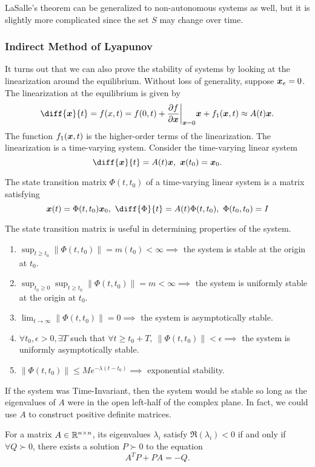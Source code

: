 LaSalle's theorem can be generalized to non-autonomous systems as well, but it
is slightly more complicated since the set $S$ may change over time.

\subsubsection{Indirect Method of Lyapunov}
It turns out that we can also prove the stability of systems by looking at the
linearization around the equilibrium. Without loss of generality, suppose
$\boldsymbol{x}_e = 0$. The linearization at the equilibrium is given by \[
	\diff{\bs{x}}{t} = f(x,t) = f(0, t) + \frac{\partial f}{\partial
	\bs{x}}\bigg\lvert_{\bs{x} = 0}\bs{x} + f_1(\bs{x},t) \approx A(t)\bs{x}.
\]
The function $f_1(\boldsymbol{x}, t)$ is the higher-order terms of the linearization.
The linearization is a time-varying system.
Consider the time-varying linear system
\[
	\diff{\bs{x}}{t} = A(t)\bs{x},\ \bs{x}(t_0) = \bs{x}_0.
\]
\begin{definition}
	The state transition matrix $\Phi(t, t_0)$ of a time-varying linear system is
	a matrix satisfying \[
		\bs{x}(t) = \Phi(t, t_0)\bs{x}_0,\ \diff{\Phi}{t} = A(t)\Phi(t, t_0),\
		\Phi(t_0, t_0) = I
	\]
	\label{defn:state-transition-matrix}
\end{definition}
The state transition matrix is useful in determining properties of the system.
\begin{enumerate}
	\item $\sup_{t\geq t_0} \|\Phi(t, t_0)\| = m(t_0) < \infty \implies$ the system
		is stable at the origin at $t_0$.
	\item $\sup_{t_0\geq 0}\sup_{t\geq t_0} \|\Phi(t, t_0)\| = m < \infty \implies$ the system
		is uniformly stable at the origin at $t_0$.
	\item $\lim_{t\to\infty}\|\Phi(t, t_0)\| = 0 \implies$ the system is
		asymptotically stable.
	\item $\forall t_0,\epsilon>0,\exists T$ such that $\forall t\geq t_0 + T,\ \|\Phi(t, t_0)\| <
		\epsilon \implies$ the system is uniformly asymptotically stable.
	\item $\|\Phi(t, t_0)\| \leq Me^{-\lambda(t-t_0)} \implies$ exponential
		stability.
\end{enumerate}
If the system was Time-Invariant, then the system would be stable so long as the
eigenvalues of $A$ were in the open left-half of the complex plane. In fact, we
could use $A$ to construct positive definite matrices.
\begin{theorem}
	For a matrix $A\in \mathbb{R}^{n\times n}$, its eigenvalues $\lambda_i$ satisfy
	$\Re(\lambda_i) < 0$ if and only if $\forall Q \succ 0$, there exists
	a solution $P\succ 0$ to the equation \[
		A^TP + PA = -Q.
	\]
	\label{thm:lyapunov-lemma}
\end{theorem}
